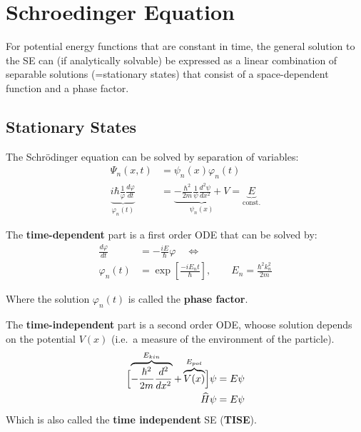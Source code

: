 \section{Schroedinger Equation}
For potential energy functions that are constant in time, the general solution to the SE can (if analytically solvable) be expressed as a linear combination of separable solutions (=stationary states) that consist of a space-dependent function and a phase factor.
\subsection{Stationary States}
The Schrödinger equation can be solved by separation of variables:
\noindent\begin{align*}
    \Psi_n(x,t)                                                        & = \psi_n(x)\varphi_n(t)                                                                                         \\
    \underbrace{i\hbar\frac1\varphi\frac{d\varphi}{dt}}_{\varphi_n(t)} & =\underbrace{-\frac{\hbar^2}{2m}\frac1\psi\frac{d^2\psi}{dx^2}+V}_{\psi_n (x)} = \underbrace{E}_{\text{const.}}
\end{align*}


The \textbf{time-dependent} part is a first order ODE that can be solved by:
\noindent\begin{align*}
    \frac{d\varphi}{dt} & =-\frac{iE}{\hbar}\varphi \quad\Leftrightarrow                                 \\
    \varphi_n(t)        & =\exp\left[\frac{-iE_n t}{\hbar}\right], \qquad E_n = \frac{\hbar^2 k_n^2}{2m}
\end{align*}

Where the solution $\varphi_n(t)$ is called the \textbf{phase factor}.
\newpar{}


The \textbf{time-independent} part is a second order ODE, whoose solution depends on the potential $V(x)$ (i.e.\ a measure of the environment of the particle).
\noindent\begin{align*}
    \Bigl[\overbrace{-\frac{\hbar^2}{2m}\frac{d^2}{dx^2}}^{E_{kin}}+ \overbrace{V(x)}^{E_{pot}}\Bigr]\psi & = E\psi \\
    \widehat{H}\psi                                                                                       & = E\psi
\end{align*}
Which is also called the \textbf{time independent} SE (\textbf{TISE}).

